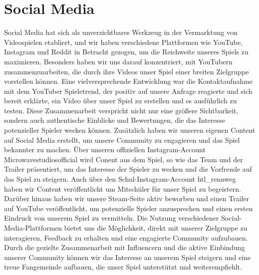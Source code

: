 
\section{Social Media}\label{sec:social-media}

\renewcommand{\kapitelautor}{Autor: Irgendwer} %

%
Social Media hat sich als unverzichtbares Werkzeug in der Vermarktung von Videospielen etabliert, und wir haben verschiedene Plattformen wie YouTube, Instagram und Reddit in Betracht gezogen, um die Reichweite unseres Spiels zu maximieren.
Besonders haben wir uns darauf konzentriert, mit YouTubern zusammenzuarbeiten, die durch ihre Videos unser Spiel einer breiten Zielgruppe vorstellen können.
Eine vielversprechende Entwicklung war die Kontaktaufnahme mit dem YouTuber Spieletrend, der positiv auf unsere Anfrage reagierte und sich bereit erklärte,
ein Video über unser Spiel zu erstellen und es ausführlich zu testen. Diese Zusammenarbeit verspricht nicht nur eine größere Sichtbarkeit, sondern auch authentische Einblicke und Bewertungen,
die das Interesse potenzieller Spieler wecken können. Zusätzlich haben wir unseren eigenen Content auf Social Media erstellt, um unsere Community zu engagieren und das Spiel bekannter zu machen.
Über unseren offiziellen Instagram-Account Microwavestudiosofficial wird Conent aus dem Spiel, so wie das Team und der Trailer präsentiert, um das Interesse der Spieler zu wecken und die Vorfreude auf das Spiel zu steigern.
Auch über den Schul-Instagram-Account htl_rennweg haben wir Content veröffentlicht um Mitschüler für unser Spiel zu begeistern.
Darüber hinaus haben wir unsere Steam-Seite aktiv beworben und einen Trailer auf YouTube veröffentlicht, um potenzielle Spieler anzusprechen und einen ersten Eindruck von unserem Spiel zu vermitteln.
Die Nutzung verschiedener Social-Media-Plattformen bietet uns die Möglichkeit, direkt mit unserer Zielgruppe zu interagieren, Feedback zu erhalten und eine engagierte Community aufzubauen.
Durch die gezielte Zusammenarbeit mit Influencern und die aktive Einbindung unserer Community können wir das Interesse an unserem Spiel steigern und eine treue Fangemeinde aufbauen, die unser Spiel unterstützt und weiterempfiehlt.
%

\renewcommand{\kapitelautor}{}
